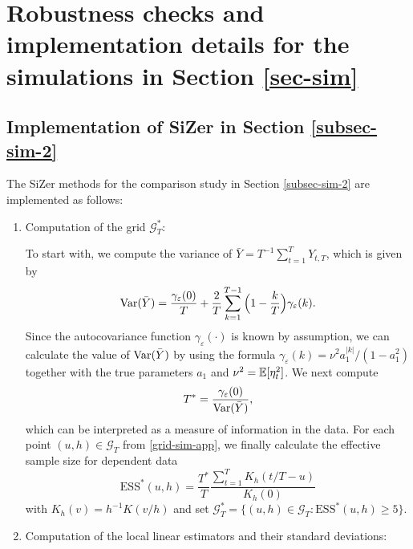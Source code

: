 
\section{Robustness checks and implementation details for the simulations in Section \ref{sec-sim}}\label{sec-supp-sim}


\subsection*{Implementation of SiZer in Section \ref{subsec-sim-2}}


The SiZer methods for the comparison study in Section \ref{subsec-sim-2} are implemented as follows:
\begin{enumerate}[leftmargin=0.7cm,label=(\alph*)]

\item Computation of the grid $\mathcal{G}_T^*$:

To start with, we compute the variance of $\bar{Y} = T^{-1} \sum_{t=1}^T Y_{t,T}$, which is given by
\[ \textnormal{Var}(\bar{Y}) = \frac{\gamma_\varepsilon(0)}{T} + \frac{2}{T} \sum_{k = 1}^{T-1} \Big(1 - \frac{k}{T}\Big)\gamma_\varepsilon(k). \]
Since the autocovariance function $\gamma_{\varepsilon}(\cdot)$ is known by assumption, we can calculate the value of $\textnormal{Var}(\bar{Y})$ by using the formula $\gamma_\varepsilon(k) = \nu^2 a_1^{|k|} / (1 - a_1^2)$ together with the true para\-meters $a_1$ and $\nu^2 = \mathbb{E}[\eta_t^2]$. We next compute 
\[ T^* = \frac{\gamma_\varepsilon(0)}{\textnormal{Var}(\bar{Y})}, \]
which can be interpreted as a measure of information in the data. For each point $(u,h) \in \mathcal{G}_T$ from \eqref{grid-sim-app}, we finally calculate the effective sample size for dependent data 
\[ \text{ESS}^*(u, h) = \frac{T^*}{T} \frac{\sum_{t=1}^T K_h(t/T - u)}{K_h(0)} \]
with $K_h(v) = h^{-1} K(v/h)$ and set $\mathcal{G}_T^* = \{ (u,h) \in \mathcal{G}_T: \text{ESS}^*(u, h) \ge 5 \}$. 

\item Computation of the local linear estimators and their standard deviations: 


\end{enumerate}
